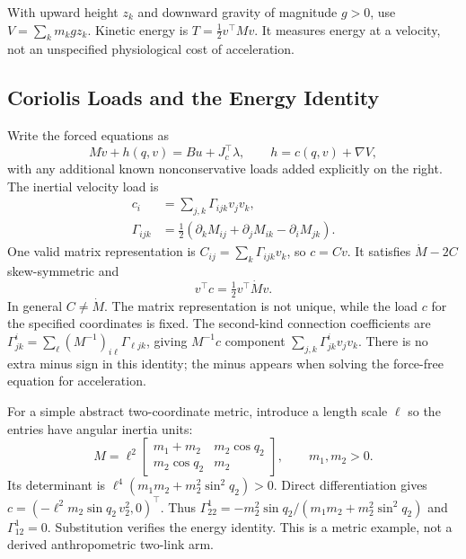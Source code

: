 With upward height $z_k$ and downward gravity of magnitude $g>0$, use $V=\sum_km_kgz_k$. Kinetic energy is $T=\tfrac12v^\top Mv$. It measures energy at a velocity, not an unspecified physiological cost of acceleration.

\subsection{Coriolis Loads and the Energy Identity}

Write the forced equations as
\begin{equation}
 M\dot v+h(q,v)=Bu+J_c^\top\lambda,\qquad h=c(q,v)+\nabla V,
 \label{eq:ch9:euler-lagrange-constrained}
\end{equation}
with any additional known nonconservative loads added explicitly on the right. The inertial velocity load is
\begin{align}
 c_i&=\sum_{j,k}\Gamma_{ijk}v_jv_k,\\
 \Gamma_{ijk}&=\tfrac12\left(\partial_kM_{ij}+\partial_jM_{ik}-\partial_iM_{jk}\right).
 \label{eq:ch9:christoffel}
\end{align}
One valid matrix representation is $C_{ij}=\sum_k\Gamma_{ijk}v_k$, so $c=Cv$. It satisfies $\dot M-2C$ skew-symmetric and
\begin{equation}
 v^\top c=\tfrac12v^\top\dot Mv.
\end{equation}
In general $C\ne\dot M$. The matrix representation is not unique, while the load $c$ for the specified coordinates is fixed. The second-kind connection coefficients are $\Gamma^i_{jk}=\sum_\ell(M^{-1})_{i\ell}\Gamma_{\ell jk}$, giving $M^{-1}c$ component $\sum_{j,k}\Gamma^i_{jk}v_jv_k$. There is no extra minus sign in this identity; the minus appears when solving the force-free equation for acceleration.

For a simple abstract two-coordinate metric, introduce a length scale $\ell$ so the entries have angular inertia units:
\begin{equation}
 M=\ell^2\begin{bmatrix}m_1+m_2&m_2\cos q_2\\m_2\cos q_2&m_2\end{bmatrix},\qquad m_1,m_2>0.
\end{equation}
Its determinant is $\ell^4(m_1m_2+m_2^2\sin^2q_2)>0$. Direct differentiation gives $c=(-\ell^2m_2\sin q_2\,v_2^2,0)^\top$. Thus $\Gamma^1_{22}=-m_2^2\sin q_2/(m_1m_2+m_2^2\sin^2q_2)$ and $\Gamma^1_{12}=0$. Substitution verifies the energy identity. This is a metric example, not a derived anthropometric two-link arm.

